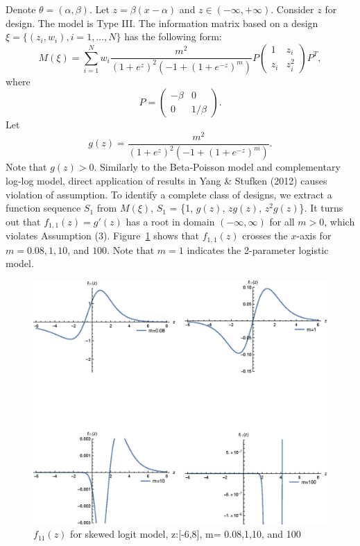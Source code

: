 \documentclass[12pt]{TD-CJS}
\begin{document}
Denote $\theta = (\alpha,\beta)$. Let $z = \beta(x-\alpha)$ and $z\in (-\infty,+\infty)$. Consider $z$ for design. The model is Type III. The information matrix based on a design $\xi = \{(z_i,w_i), i=1, \ldots, N\}$ has the following form: \[
M(\xi) = \sum_{i=1}^{N} w_i \frac{m^2}{(1+e^z)^2(-1+(1+e^{-z})^m)}P \left( \begin{array}{cc}
1 & z_i\\
z_i & z_i^2
\end{array} \right) P^T,
\] where \[P = \left( \begin{array}{cc}
-\beta & 0\\
0 & 1/\beta
\end{array} \right).\] 
Let \[g(z) =  \frac{m^2}{(1+e^z)^2(-1+(1+e^{-z})^m)}.\] Note that $g(z)>0$.  Similarly to the Beta-Poisson model and complementary log-log model, direct application of results in Yang \& Stufken (2012) causes violation of assumption. To identify a complete class of designs, we extract a function sequence $S_1$ from $M(\xi)$,  $S_1$ = \{1, $g(z)$, $zg(z)$, $z^2g(z)$\}. It turns out that $f_{1,1}(z) = g'(z)$ has a root in domain $(-\infty,\infty)$ for all $m>0$, which violates Assumption (3).  Figure~\ref{fig:skewedlogit_before} shows that $f_{1,1}(z) $ crosses the $x$-axis for $m = 0.08, 1, 10$, and $100$. Note that $m=1$ indicates the 2-parameter logistic model.  
\begin{figure}[ht]
    \centering
    \includegraphics[scale = 0.8]{fig1.eps}
    \caption{$f_{11}(z)$ for skewed logit model, z:[-6,8], m= 0.08,1,10, and 100}
    \label{fig:skewedlogit_before}
\end{figure}
\end{document}
